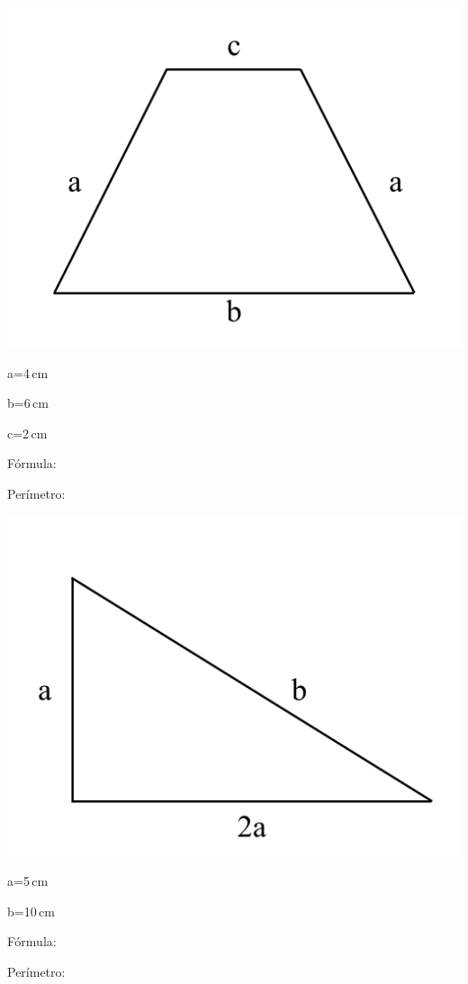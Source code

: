 \documentclass[11pt]{article}
\begin{document}
\begin{minipage}[t]{0.3\linewidth}

\includegraphics[width=0.9\linewidth]{figures/figures001.png}

a=4\,cm

b=6\,cm

c=2\,cm

\vspace{5mm}

F\'ormula:

\vspace{2cm}

Per\'imetro:

\end{minipage}
\begin{minipage}[t]{0.3\linewidth}

\includegraphics[width=0.9\linewidth]{figures/figures002.png}

a=5\,cm

b=10\,cm

\vspace{10mm}

F\'ormula:

\vspace{2cm}

Per\'imetro:

\end{minipage}
\end{document}
